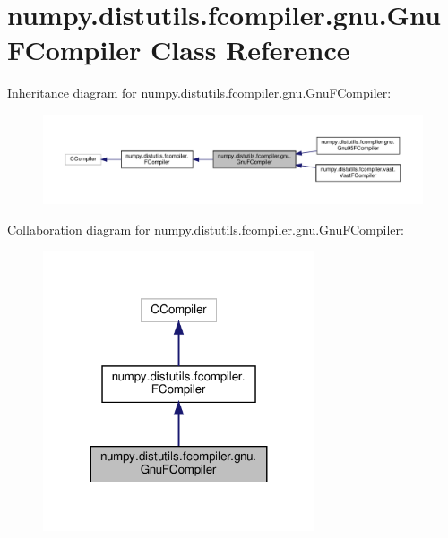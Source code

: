 \hypertarget{classnumpy_1_1distutils_1_1fcompiler_1_1gnu_1_1GnuFCompiler}{}\section{numpy.\+distutils.\+fcompiler.\+gnu.\+Gnu\+F\+Compiler Class Reference}
\label{classnumpy_1_1distutils_1_1fcompiler_1_1gnu_1_1GnuFCompiler}


Inheritance diagram for numpy.\+distutils.\+fcompiler.\+gnu.\+Gnu\+F\+Compiler\+:
\nopagebreak
\begin{figure}[H]
\begin{center}
\leavevmode
\includegraphics[width=350pt]{classnumpy_1_1distutils_1_1fcompiler_1_1gnu_1_1GnuFCompiler__inherit__graph}
\end{center}
\end{figure}


Collaboration diagram for numpy.\+distutils.\+fcompiler.\+gnu.\+Gnu\+F\+Compiler\+:
\nopagebreak
\begin{figure}[H]
\begin{center}
\leavevmode
\includegraphics[width=227pt]{classnumpy_1_1distutils_1_1fcompiler_1_1gnu_1_1GnuFCompiler__coll__graph}
\end{center}
\end{figure}
